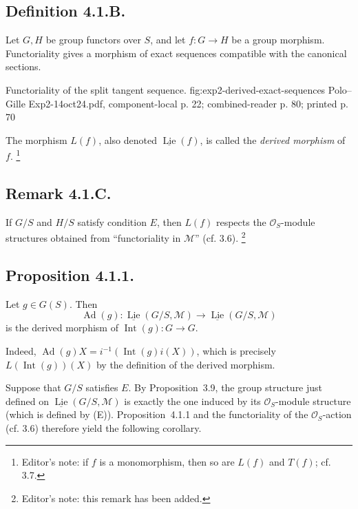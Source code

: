 \subsection*{Definition 4.1.B.}
Let \(G,H\) be group functors over \(S\), and let \(f:G\to H\) be a group
morphism. Functoriality gives a morphism of exact sequences compatible
with the canonical sections.

  {Functoriality of the split tangent sequence.}
  {fig:exp2-derived-exact-sequences}
  {Polo--Gille Exp2-14oct24.pdf, component-local p. 22; combined-reader p. 80; printed p. 70}

The morphism \(L(f)\), also denoted
\(\underline{\operatorname{Lie}}(f)\), is called the \emph{derived
morphism} of \(f\).
\footnote{Editor's note: if \(f\) is a monomorphism, then so are \(L(f)\)
and \(T(f)\); cf. 3.7.}

\subsection*{Remark 4.1.C.}
If \(G/S\) and \(H/S\) satisfy condition \(E\), then \(L(f)\) respects the
\(\mathcal O_S\)-module structures obtained from ``functoriality in
\(\mathcal M\)'' (cf. 3.6).
\footnote{Editor's note: this remark has been added.}

\subsection*{Proposition 4.1.1.}
Let \(g\in G(S)\). Then
\[
  \operatorname{Ad}(g):
  \underline{\operatorname{Lie}}(G/S,\mathcal M)
  \longrightarrow
  \underline{\operatorname{Lie}}(G/S,\mathcal M)
\]
is the derived morphism of
\(\operatorname{Int}(g):G\to G\).

Indeed,
\(\operatorname{Ad}(g)X=i^{-1}(\operatorname{Int}(g)i(X))\), which is
precisely \(L(\operatorname{Int}(g))(X)\) by the definition of the
derived morphism.

Suppose that \(G/S\) satisfies \(E\). By Proposition~3.9, the group
structure just defined on
\(\underline{\operatorname{Lie}}(G/S,\mathcal M)\) is exactly the one
induced by its \(\mathcal O_S\)-module structure (which is defined by
(E)). Proposition~4.1.1 and the functoriality of the
\(\mathcal O_S\)-action (cf. 3.6) therefore yield the following
corollary.


